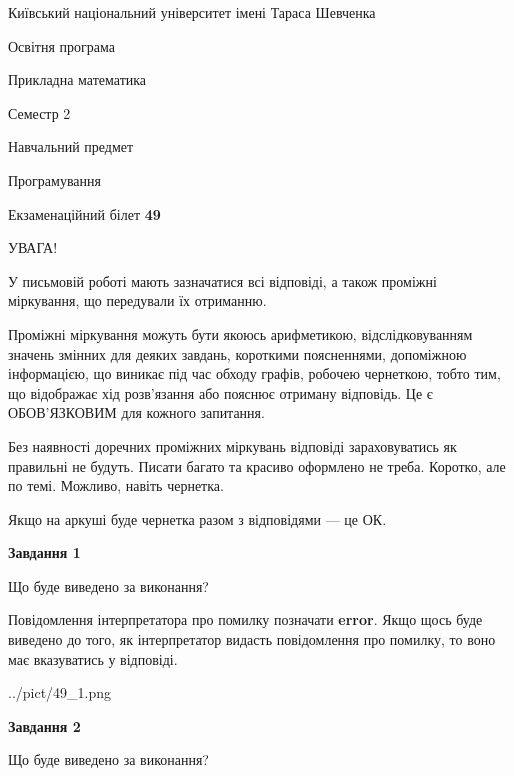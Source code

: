 \documentclass[12pt, ukrainian]{article}
\begin{document}
{{\begin {small}\par
{ \center  Київський національний університет імені Тараса Шевченка \par}
{\parbox {5 cm}{Освітня програма \hfill}{\parbox {7 cm}{Прикладна математика \hfill}}\parbox {6 cm}{\hfill Семестр 2}}\par
{\parbox {5 cm} {Навчальний предмет \hfill}\parbox {7 cm}{Програмування \hfill}\parbox {6cm}{\hfill}\par}\vspace{-7pt} \end{small}}{\center Екзаменаційний білет \No \textbf
{ 49 }\par}}
{
\begin {large}
УВАГА!

У письмовій роботі мають зазначатися всі відповіді, а також проміжні міркування, що передували їх отриманню.

Проміжні міркування можуть бути якоюсь арифметикою, відслідковуванням зна\-чень змінних для деяких завдань,
короткими поясненнями, допоміжною інформацією, що виникає під час обходу графів, робочею чернеткою,
тобто тим, що відображає хід розв’язання або пояснює отриману відповідь.
Це є ОБОВ’ЯЗКОВИМ для кожного запитання.

Без наявності доречних проміжних міркувань відповіді зараховуватись як правиль\-ні не будуть.
Писати багато та красиво оформлено не треба. Коротко, але по темі. Можли\-во, навіть чернетка.

Якщо на аркуші буде чернетка разом з відповідями --- це ОК.

\newpage

{\begin {center}\textbf{Завдання 1}\end {center}}\par
Що буде виведено за виконання?

Повідомлення інтерпретатора про помилку позначати \textbf{error}.
Якщо щось буде виведено до того, як інтерпретатор видасть повідомлення про помилку, 
то воно має вказуватись у відповіді. \par


\begin{center}
	{../pict/49_1.png}
\end{center}
\newpage

{\begin {center}\textbf{Завдання 2}\end {center}}\par
Що буде виведено за виконання?


\end{large}}
\end{document}
